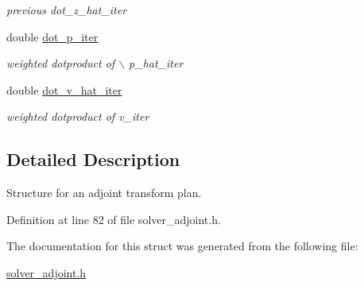 \begin{CompactItemize}
\begin{CompactList}\small\item\em previous dot\_\-z\_\-hat\_\-iter \item\end{CompactList}\item 
\hypertarget{structimri__inh__3d__adjoint__plan_o16}{
double \hyperlink{structimri__inh__3d__adjoint__plan_o16}{dot\_\-p\_\-iter}}
\label{structimri__inh__3d__adjoint__plan_o16}

\begin{CompactList}\small\item\em weighted dotproduct of $\backslash$ p\_\-hat\_\-iter \item\end{CompactList}\item 
\hypertarget{structimri__inh__3d__adjoint__plan_o17}{
double \hyperlink{structimri__inh__3d__adjoint__plan_o17}{dot\_\-v\_\-hat\_\-iter}}
\label{structimri__inh__3d__adjoint__plan_o17}

\begin{CompactList}\small\item\em weighted dotproduct of v\_\-iter \item\end{CompactList}\end{CompactItemize}


\subsection{Detailed Description}
Structure for an adjoint transform plan. 



Definition at line 82 of file solver\_\-adjoint.h.

The documentation for this struct was generated from the following file:\begin{CompactItemize}
\item 
\hyperlink{solver__adjoint_8h}{solver\_\-adjoint.h}\end{CompactItemize}
